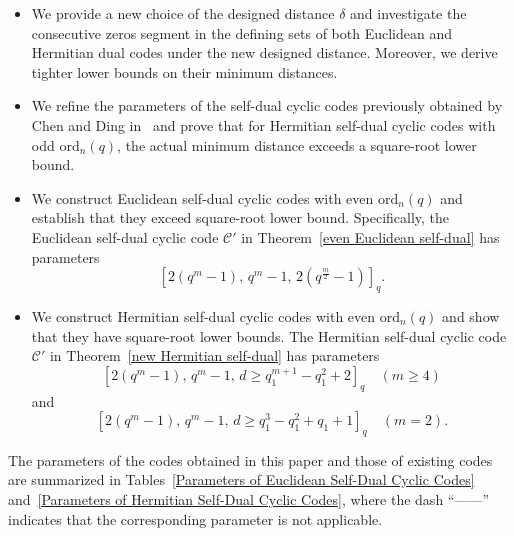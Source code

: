 \documentclass[journal,12pt,onecolumn]{IEEEtran}
\begin{document}
\begin{itemize}
    \item We provide a new choice of the designed distance $\delta$ and investigate the consecutive zeros segment in the defining sets of both Euclidean and Hermitian dual codes under the new designed distance. Moreover, we derive tighter lower bounds on their minimum distances.
    \item We refine the parameters of the self-dual cyclic codes previously obtained by Chen and Ding in~\cite{10856234} and prove that for Hermitian self-dual cyclic codes with odd $\mathrm{ord}_n(q)$, the actual minimum distance exceeds a square-root lower bound.
    \item We construct Euclidean self-dual cyclic codes with even $\mathrm{ord}_n(q)$ and establish that they exceed square-root lower bound. Specifically, the Euclidean self-dual cyclic code $\mathcal{C}'$ in Theorem~\ref{even Euclidean self-dual} has parameters
    \[
    [2(q^m - 1),\, q^m - 1,\,2(q^{\frac{m}{2}} - 1)]_q.
    \]
    \item We construct Hermitian self-dual cyclic codes with even $\mathrm{ord}_n(q)$ and show that they have square-root lower bounds. The Hermitian self-dual cyclic code $\mathcal{C}'$ in Theorem~\ref{new Hermitian self-dual} has parameters
    \[
    [2(q^m - 1),\, q^m - 1,\, d \ge q_1^{m+1} - q_1^2 + 2]_q \quad (m\ge 4)
    \] and
    \[
    [2(q^m - 1),\, q^m - 1,\, d \ge q_1^3 - q_1^2 + q_1 + 1]_q \quad (m=2).
    \]
\end{itemize}
The parameters of the codes obtained in this paper and those of existing codes are summarized in Tables~\ref{Parameters of Euclidean Self-Dual Cyclic Codes} and~\ref{Parameters of Hermitian Self-Dual Cyclic Codes}, where the dash ``——'' indicates that the corresponding parameter is not applicable.
\end{document}
